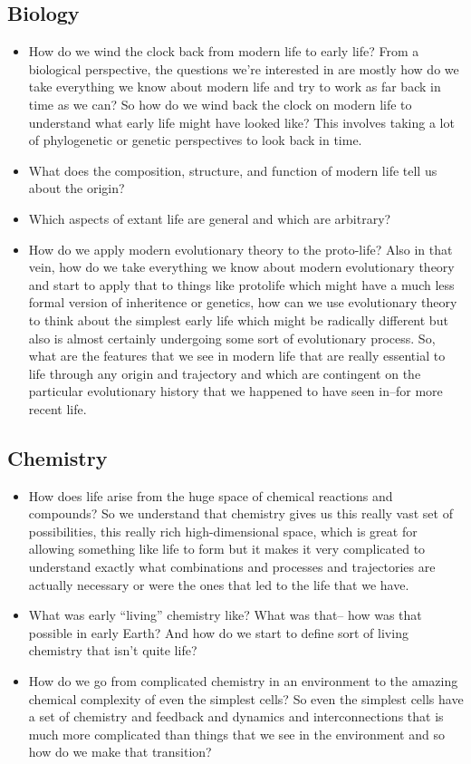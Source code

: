 \documentclass[]{article}
\begin{document}
\subsection{Biology}
\begin{itemize}
	\item How do we wind the clock back from modern life to early life? From a biological perspective, the questions we're interested in are mostly 	how do we take everything we know about
	modern life and try to work as far back in
	time as we can? So how do we wind back the
	clock on modern life to understand what
	early life might have looked like?
	This involves taking a lot of
	phylogenetic or genetic perspectives to
	look back in time.
	\item  What does the composition, structure, and function of modern life tell us about the origin?
	\item  Which aspects of extant life are general and which are arbitrary?
	\item How do we apply modern evolutionary theory to the proto-life? Also in that vein, how do we take
	everything we know about modern
	evolutionary theory and start to apply that to things like protolife which
	might have a much less formal version of
	inheritence or genetics,
	how can we use evolutionary theory to
	think about the simplest early life which
	might be radically different but also is 
	almost certainly undergoing some sort of
	evolutionary process. So, what are the features that we see in
	modern life that are really essential to
	life through any origin and trajectory and
	which are contingent on the particular
	evolutionary history that we happened to
	have seen in--for more recent life.
\end{itemize}	


\subsection{Chemistry}
\begin{itemize}
	\item How does life arise from the huge space of chemical reactions and compounds? 
	So we understand that chemistry gives us
	this really vast set of possibilities,
	this really rich high-dimensional space,
	which is great for allowing something
	like life to form but it makes it very
	complicated to understand exactly what
	combinations and processes and
	trajectories are actually necessary or
	were the ones that led to the life that we
	have.
	\item What was early “living” chemistry like? What was that-- how was
	that possible in early Earth? And how do
	we start to define sort of living
	chemistry that isn't quite life?
	\item How do we go from complicated chemistry in an environment to the amazing chemical complexity of even the simplest cells? So even the simplest cells have a set of 	chemistry and feedback and dynamics and 	interconnections that is much more 
	complicated than things that we see in the 	environment and so how do we make that
	transition?
\end{itemize}
\end{document}
